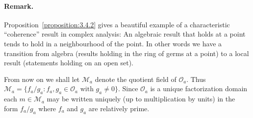 \paragraph*{Remark.} Proposition~\ref{proposition:3.4.2} gives a beautiful example of a characteristic ``coherence'' result in complex analysis: An algebraic result that holds at a point tends to hold in a neighbourhood of the point. In other words we have a transition from algebra (results holding in the ring of germs at a point) to a local result (statements holding on an open set).

From now on we shall let $\mathcal M_a$ denote the quotient field of $\mathcal O_a$. Thus $\mathcal M_a=\{f_a/g_a:f_a,g_a\in\mathcal O_a\text{ with }g_a\ne0\}$. Since $\mathcal O_a$ is a unique factorization domain each $m\in\mathcal M_a$ may be written uniquely (up to multiplication by units) in the form $f_a/g_a$ where $f_a$ and $g_a$ are relatively prime.

